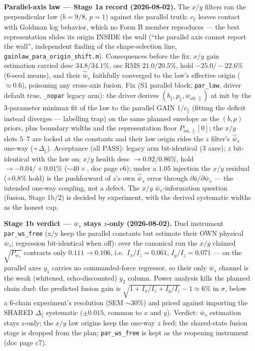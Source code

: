 \documentclass[11pt,a4paper,fontset=none]{ctexart}
\begin{document}
\textbf{Parallel-axis law --- Stage 1a record (2026-08-02).}  The $x/y$
filters ran the perpendicular law ($b = 9/8$, $p = 1$) against the
parallel truth: $c_\parallel$ leaves contact with Goldman log behavior,
which no Form B member reproduces --- the best representation slides its
origin INSIDE the wall (``the parallel axis cannot report the wall'',
independent finding of the shape-selection line,
\texttt{gainlaw\_para\_origin\_shift.m}).  Consequences before the fix:
$x/y$ gain estimation carried desc $34.8/34.1\%$, osc RMS
$21.0/20.5\%$, hold $-25.0/-22.6\%$ (6-seed means), and their
$\hat{\bar{w}}_s$ faithfully converged to the law's effective origin
($\approx 0.6$), poisoning any cross-axis fusion.  Fix (S1 parallel
block; \texttt{par\_law}, driver default true, \texttt{\_nopar} legacy
arm): the driver derives $(b_\parallel, p_\parallel,
\bar{w}_{s0,\parallel})$ at init by the 3-parameter minimax fit of the
law to the parallel GAIN $1/c_\parallel$ (fitting the deficit instead
diverges --- labelling trap) on the same planned envelope as the
$(b,p)$ priors, plus boundary widths and the representation floor
$P_{\bar{a}\bar{a},\parallel}[0]$; the $x/y$ slots $5$--$7$ are locked
at the constants and their law origin rides the $z$ filter's
$\hat{\bar{w}}_s$ one-way ($+\Delta_\parallel$).  Acceptance (all
PASS): legacy arm bit-identical (3 axes); $z$ bit-identical with the
law on; $x/y$ health desc $\to 0.92/0.86\%$, hold $\to
-0.04/+0.01\%$ ($\sim 40\times$, doc page c6); under a $1.05$
injection the $x/y$ residual ($+0.8\%$ hold) is the pushforward of
$z$'s own $\hat{\bar{w}}_s$ error through
$\partial\bar{a}/\partial\bar{w}_s$ --- the intended one-way coupling,
not a defect.  The $x/y$ $\bar{w}_s$-information question (fusion,
Stage 1b/2) is decided by experiment, with the derived systematic
widths as the honest cap.

\textbf{Stage 1b verdict --- $\bar{w}_s$ stays $z$-only (2026-08-02).}
Duel instrument \texttt{par\_ws\_free} (x/y keep the parallel constants
but estimate their OWN physical $\bar{w}_s$; regression bit-identical
when off): over the canonical run the $x/y$ claimed $\sqrt{P_{w_s}}$
contracts only $0.111 \to 0.106$, i.e.\ $I_{x}/I_z = 0.061$,
$I_{y}/I_z = 0.071$ --- on the parallel axes $y_1$ carries no
commanded-force regressor, so their only $\bar{w}_s$ channel is the
weak (whitened, echo-discounted) $y_2$ column.  Power analysis kills
the planned chain duel: the predicted fusion gain is
$\sqrt{1 + I_x/I_z + I_y/I_z} - 1 \approx 6\%$ in $\sigma$, below a
6-chain experiment's resolution (SEM $\sim 30\%$) and priced against
importing the SHARED $\Delta_\parallel$ systematic ($\pm 0.015$,
common to $x$ and $y$).  Verdict: $\bar{w}_s$ estimation stays
$z$-only; the $x/y$ law origins keep the one-way $z$ feed; the
shared-state fusion stage is dropped from the plan;
\texttt{par\_ws\_free} is kept as the reopening instrument (doc page
c7).
\end{document}
